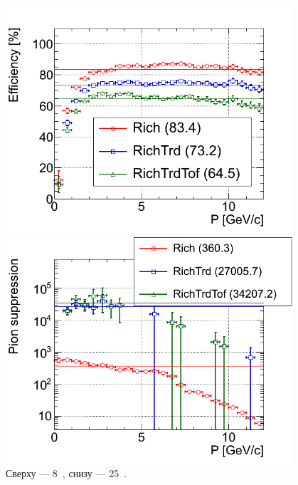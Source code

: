 \begin{figure}[H]
\begin{minipage}[t]{0.495\textwidth}
\includegraphics[width=0.95\textwidth]{pictures/RICHeff3.png}
\end{minipage}
\begin{minipage}[t]{0.495\textwidth}
\includegraphics[width=0.95\textwidth]{pictures/RICHeff4.png}
\end{minipage}
\caption{Сверху --- 8~\GeVperNucl{}, снизу --- 25~\GeVperNucl{}.}
\label{fig:RICHeff}
\end{figure}

